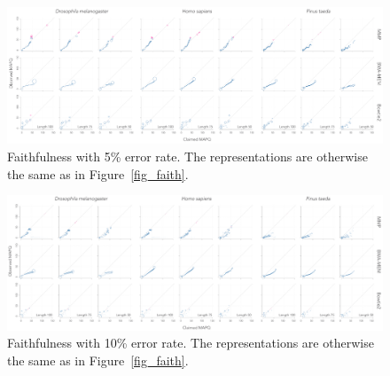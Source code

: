 \documentclass[a4,center,fleqn]{NAR}
\begin{document}
\begin{figure}[t]
\begin{center}
\includegraphics[scale=.24]{faith_Q5.pdf}
\end{center}
\caption{Faithfulness with 5\% error rate. The representations are
otherwise the same as in Figure~\ref{fig_faith}.}
\end{figure}

\begin{figure}[t]
\begin{center}
\includegraphics[scale=.24]{faith_Q10.pdf}
\end{center}
\caption{Faithfulness with 10\% error rate. The representations are
otherwise the same as in Figure~\ref{fig_faith}.}
\end{figure}

%
%
%
%
%
\end{document}
